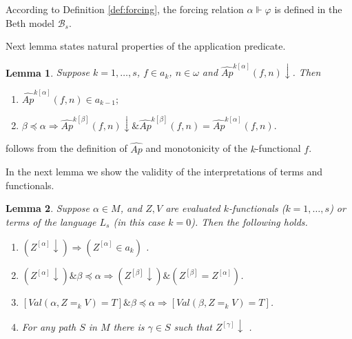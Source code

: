 \documentclass{asl}
\newtheorem{lemma}{Lemma}[section]
\theoremstyle{definition}
\begin{document}
According to Definition \ref{def:forcing}, the forcing relation $\alpha\Vdash\varphi $ is defined in the Beth model $\mathcal{B}_s$.

Next lemma states natural properties of the application predicate.

\begin{lemma}
Suppose $k=1, \ldots, s$,  $f\!\in \! a_{k}$,  $n\in \omega $ and $ \widehat{Ap}^{k[\alpha]}(f,n) \downarrow$. Then 

\begin{enumerate}
\item $ \widehat{Ap}^{k[\alpha]}(f,n) \in a_{k-1};$ 
\bigskip

\item $ \beta\preccurlyeq\alpha  \Rightarrow \widehat{Ap}^{k[\beta]}(f,n) \downarrow \& \widehat{Ap}^{k[\beta]}(f,n) = \widehat{Ap}^{k[\alpha]}(f,n).$ 

\end{enumerate} \label{lemma:ap_predicate}
\end{lemma} 

\begin{proofplain}
follows from the definition of $\widehat{Ap}$ and monotonicity of the $k$-functional $f$.
\end{proofplain}

In the next lemma we show the validity of the interpretations of terms and functionals. 

\begin{lemma}
Suppose $ \alpha\in M $, and $ Z, V $ are evaluated $ k $-functionals ($ k=1, \ldots, s $) or terms of the language $ L_{s} $ (in this case $ k=0$). Then the following holds.

\begin{enumerate}
\item $ \left(Z^{[\alpha]}\downarrow\right) \Rightarrow \left(Z^{[\alpha]} \in a_{k}\right)$ .
\bigskip

\item $ \left(Z^{[\alpha]}\downarrow\right) \& \beta\preccurlyeq\alpha \Rightarrow \left(Z^{[\beta]}\downarrow\right) \&  \left(Z^{[\beta]}= Z^{[\alpha]}\right)$.
\medskip

\item $\left[ Val(\alpha,Z=_kV)=T\right]  \& \beta\preccurlyeq\alpha \Rightarrow \left[ Val(\beta,Z=_kV)=T\right]  $.
\medskip

\item For any path $ S $ in $ M $ there is $ \gamma\in S$ such that $ Z^{[\gamma]}\downarrow $ .

\end{enumerate} \label{lemma:term_int}
\end{lemma}
\end{document}
